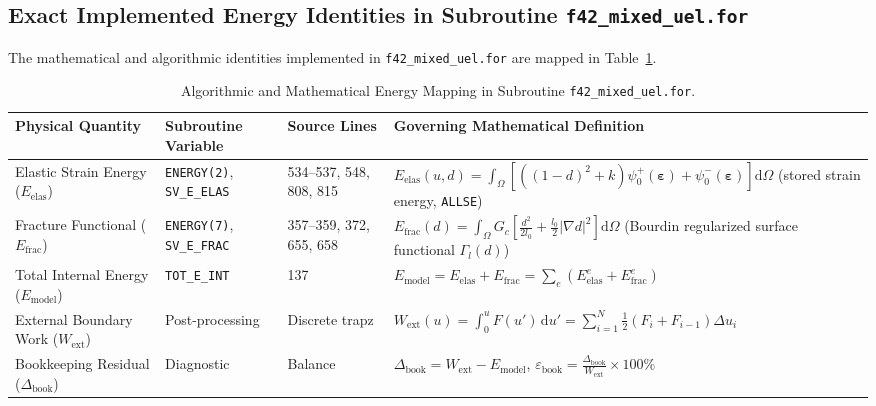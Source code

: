 \subsection{Exact Implemented Energy Identities in Subroutine \texttt{f42\_mixed\_uel.for}}
\label{subsec:stage14uw_identities}

The mathematical and algorithmic identities implemented in \texttt{f42\_mixed\_uel.for} are mapped in Table~\ref{tab:stage14uw_subroutine_mapping}.

\begin{table}[htbp]
\centering
\footnotesize
\caption{Algorithmic and Mathematical Energy Mapping in Subroutine \texttt{f42\_mixed\_uel.for}.}
\label{tab:stage14uw_subroutine_mapping}
\begin{tabularx}{\textwidth}{p{2.2cm} p{2.2cm} p{2.0cm} X}
\toprule
\textbf{Physical Quantity} & \textbf{Subroutine Variable} & \textbf{Source Lines} & \textbf{Governing Mathematical Definition} \\
\midrule
Elastic Strain Energy ($E_{\mathrm{elas}}$) & \texttt{ENERGY(2)}, \texttt{SV\_E\_ELAS} & 534--537, 548, 808, 815 & $E_{\mathrm{elas}}(u, d) = \int_\Omega \left[ ((1-d)^2 + k)\psi_0^+(\boldsymbol{\varepsilon}) + \psi_0^-(\boldsymbol{\varepsilon}) \right] \mathrm{d}\Omega$ (stored strain energy, \texttt{ALLSE}) \\
Fracture Functional ($E_{\mathrm{frac}}$) & \texttt{ENERGY(7)}, \texttt{SV\_E\_FRAC} & 357--359, 372, 655, 658 & $E_{\mathrm{frac}}(d) = \int_\Omega G_c \left[ \frac{d^2}{2l_0} + \frac{l_0}{2} |\nabla d|^2 \right] \mathrm{d}\Omega$ (Bourdin regularized surface functional $\Gamma_l(d)$) \\
Total Internal Energy ($E_{\mathrm{model}}$) & \texttt{TOT\_E\_INT} & 137 & $E_{\mathrm{model}} = E_{\mathrm{elas}} + E_{\mathrm{frac}} = \sum_e (E_{\mathrm{elas}}^e + E_{\mathrm{frac}}^e)$ \\
External Boundary Work ($W_{\mathrm{ext}}$) & Post-processing & Discrete trapz & $W_{\mathrm{ext}}(u) = \int_0^u F(u')\,\mathrm{d}u' = \sum_{i=1}^N \frac{1}{2}(F_i + F_{i-1})\Delta u_i$ \\
Bookkeeping Residual ($\Delta_{\mathrm{book}}$) & Diagnostic & Balance & $\Delta_{\mathrm{book}} = W_{\mathrm{ext}} - E_{\mathrm{model}}$, \quad $\varepsilon_{\mathrm{book}} = \frac{\Delta_{\mathrm{book}}}{W_{\mathrm{ext}}} \times 100\%$ \\
\bottomrule
\end{tabularx}
\end{table}

